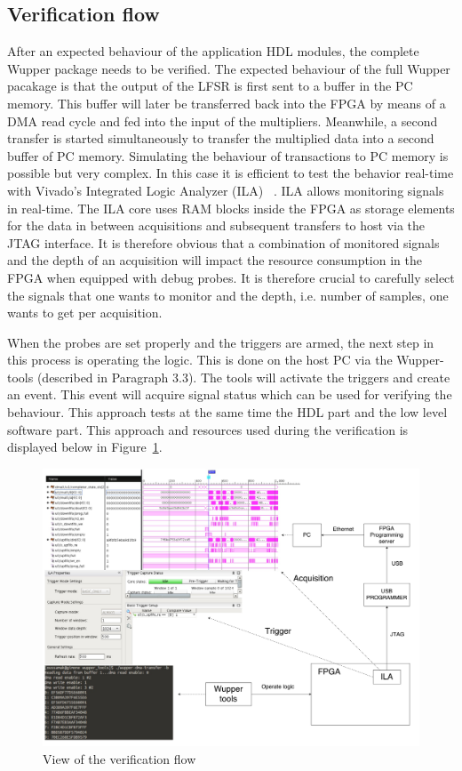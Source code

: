 \subsection{Verification flow}
After an expected behaviour of the application HDL modules, the complete Wupper package needs to be verified. The expected behaviour of the full Wupper pacakage is that the output of the LFSR is first sent to a buffer in the PC memory. This buffer will later be transferred back into the FPGA by means of a DMA read cycle and fed into the input of the multipliers. Meanwhile, a second transfer is started simultaneously to transfer the multiplied data into a second buffer of PC memory.
Simulating the behaviour of transactions to PC memory is possible but very complex. In this case it is efficient to test the behavior real-time with Vivado's Integrated Logic Analyzer (ILA) ~\cite{ila}. ILA allows monitoring signals in real-time. The ILA core uses RAM blocks inside the FPGA as storage elements for the data in between acquisitions and subsequent transfers to host via the JTAG interface. It is therefore obvious that a combination of monitored signals and the depth of an acquisition will impact the resource consumption in the FPGA when equipped with debug probes. It is therefore crucial to carefully select the signals that one wants to monitor and the depth, i.e. number of samples, one wants to get per acquisition.

\newpage
When the probes are set properly and the triggers are armed, the next step in this process is operating the logic. This is done on the host PC via the Wupper-tools (described in Paragraph 3.3). The tools will activate the triggers and create an event. This event will acquire signal status which can be used for verifying the behaviour. This approach tests at the same time the HDL part and the low level software part. This approach and resources used during the verification is displayed below in Figure~\ref{fig:veriflow}.

\begin{figure}[h]
	\includegraphics[width = 1 \textwidth]{figures/veriflow.pdf}	
	\caption{View of the verification flow}
	\label{fig:veriflow}
\end{figure}

